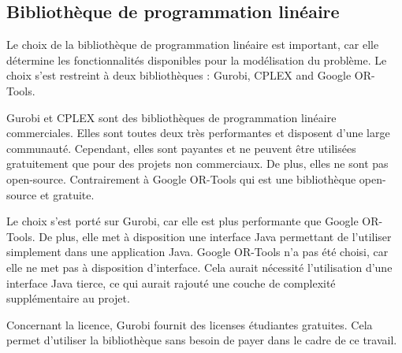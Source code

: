 \subsection{Bibliothèque de programmation linéaire}
Le choix de la bibliothèque de programmation linéaire est important, car elle détermine les fonctionnalités disponibles pour la modélisation du problème. Le choix s'est restreint à deux bibliothèques : Gurobi, CPLEX and Google OR-Tools.

Gurobi et CPLEX sont des bibliothèques de programmation linéaire commerciales. Elles sont toutes deux très performantes et disposent d'une large communauté. Cependant, elles sont payantes et ne peuvent être utilisées gratuitement que pour des projets non commerciaux. De plus, elles ne sont pas open-source. Contrairement à Google OR-Tools qui est une bibliothèque open-source et gratuite.

Le choix s'est porté sur Gurobi, car elle est plus performante que Google OR-Tools. De plus, elle met à disposition une interface Java permettant de l'utiliser simplement dans une application Java. Google OR-Tools n'a pas été choisi, car elle ne met pas à disposition d'interface. Cela aurait nécessité l'utilisation d'une interface Java tierce, ce qui aurait rajouté une couche de complexité supplémentaire au projet.

Concernant la licence, Gurobi fournit des licenses étudiantes gratuites. Cela permet d'utiliser la bibliothèque sans besoin de payer dans le cadre de ce travail.